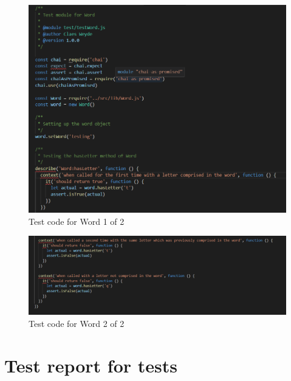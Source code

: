 \documentclass[12pt, letterpaper]{article}
\begin{document}
\begin{figure}[H]\label{fig:code31}
	\includegraphics{code3_1}
	\caption{Test code for Word 1 of 2}
	\centering
\end{figure}
\begin{figure}[H]\label{fig:code32}
	\includegraphics[width=15cm]{code3_2}
	\caption{Test code for Word 2 of 2}
	\centering
\end{figure}
\newpage
\section{Test report for tests}\label{matrix}
\end{document}
